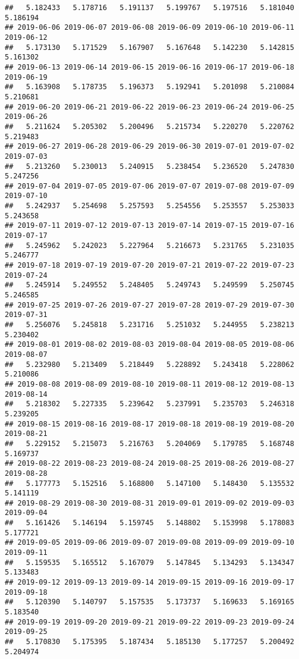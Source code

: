 \documentclass[
]{article}
\begin{document}
\begin{verbatim}
##   5.182433   5.178716   5.191137   5.199767   5.197516   5.181040   5.186194 
## 2019-06-06 2019-06-07 2019-06-08 2019-06-09 2019-06-10 2019-06-11 2019-06-12 
##   5.173130   5.171529   5.167907   5.167648   5.142230   5.142815   5.161302 
## 2019-06-13 2019-06-14 2019-06-15 2019-06-16 2019-06-17 2019-06-18 2019-06-19 
##   5.163908   5.178735   5.196373   5.192941   5.201098   5.210084   5.210681 
## 2019-06-20 2019-06-21 2019-06-22 2019-06-23 2019-06-24 2019-06-25 2019-06-26 
##   5.211624   5.205302   5.200496   5.215734   5.220270   5.220762   5.219483 
## 2019-06-27 2019-06-28 2019-06-29 2019-06-30 2019-07-01 2019-07-02 2019-07-03 
##   5.213260   5.230013   5.240915   5.238454   5.236520   5.247830   5.247256 
## 2019-07-04 2019-07-05 2019-07-06 2019-07-07 2019-07-08 2019-07-09 2019-07-10 
##   5.242937   5.254698   5.257593   5.254556   5.253557   5.253033   5.243658 
## 2019-07-11 2019-07-12 2019-07-13 2019-07-14 2019-07-15 2019-07-16 2019-07-17 
##   5.245962   5.242023   5.227964   5.216673   5.231765   5.231035   5.246777 
## 2019-07-18 2019-07-19 2019-07-20 2019-07-21 2019-07-22 2019-07-23 2019-07-24 
##   5.245914   5.249552   5.248405   5.249743   5.249599   5.250745   5.246585 
## 2019-07-25 2019-07-26 2019-07-27 2019-07-28 2019-07-29 2019-07-30 2019-07-31 
##   5.256076   5.245818   5.231716   5.251032   5.244955   5.238213   5.230402 
## 2019-08-01 2019-08-02 2019-08-03 2019-08-04 2019-08-05 2019-08-06 2019-08-07 
##   5.232980   5.213409   5.218449   5.228892   5.243418   5.228062   5.210086 
## 2019-08-08 2019-08-09 2019-08-10 2019-08-11 2019-08-12 2019-08-13 2019-08-14 
##   5.218302   5.227335   5.239642   5.237991   5.235703   5.246318   5.239205 
## 2019-08-15 2019-08-16 2019-08-17 2019-08-18 2019-08-19 2019-08-20 2019-08-21 
##   5.229152   5.215073   5.216763   5.204069   5.179785   5.168748   5.169737 
## 2019-08-22 2019-08-23 2019-08-24 2019-08-25 2019-08-26 2019-08-27 2019-08-28 
##   5.177773   5.152516   5.168800   5.147100   5.148430   5.135532   5.141119 
## 2019-08-29 2019-08-30 2019-08-31 2019-09-01 2019-09-02 2019-09-03 2019-09-04 
##   5.161426   5.146194   5.159745   5.148802   5.153998   5.178083   5.177721 
## 2019-09-05 2019-09-06 2019-09-07 2019-09-08 2019-09-09 2019-09-10 2019-09-11 
##   5.159535   5.165512   5.167079   5.147845   5.134293   5.134347   5.133483 
## 2019-09-12 2019-09-13 2019-09-14 2019-09-15 2019-09-16 2019-09-17 2019-09-18 
##   5.120390   5.140797   5.157535   5.173737   5.169633   5.169165   5.183540 
## 2019-09-19 2019-09-20 2019-09-21 2019-09-22 2019-09-23 2019-09-24 2019-09-25 
##   5.170830   5.175395   5.187434   5.185130   5.177257   5.200492   5.204974 

\end{verbatim}
\end{document}
